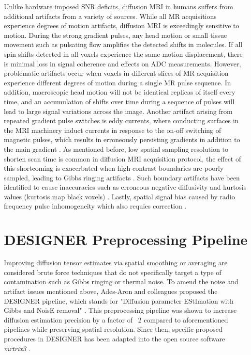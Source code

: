 Unlike hardware imposed SNR deficits, diffusion MRI in humans suffers from additional artifacts from a variety of sources. While all MR acquisitions experience degrees of motion artifacts, diffusion MRI is exceedingly sensitive to motion. During  the strong gradient pulses, any head motion or small tissue movement such as pulsating flow amplifies the detected shifts in molecules. If all spin shifts detected in all voxels experience the same motion displacement, there is minimal loss in signal coherence and effects on ADC measurements. However, problematic artifacts occur when voxels in different slices of MR acquisition experience different degrees of motion during a single MR pulse sequence. In addition, macroscopic head motion will not be identical replicas of itself every time, and an accumulation of shifts over time during a sequence of pulses will lead to large signal variations across the image\cite{le_bihan_artifacts_2006}. Another artifact arising from repeated gradient pulse switches is eddy currents, where conducting surfaces in the MRI machinery induct currents in response to the on-off switching of magnetic pulses, which results in erroneously persisting gradients in addition to the main gradient \cite{andersson_model-based_2002,andersson_integrated_2016}. As mentioned before, low spatial sampling resolution to shorten scan time is common in diffusion MRI acquisition protocol, the effect of this shortcoming is exacerbated when high-contrast boundaries are poorly sampled, leading to Gibbs ringing artifacts \cite{veraart_gibbs_2016,wheeler_2021,tournier_diffusion_2011}. Such boundary artifacts have been identified to cause inaccuracies such as erroneous negative diffusivity and kurtosis values (kurtosis map black voxels) \cite{veraart_gibbs_2016,kellner_gibbs-ringing_2016,perrone_effect_2015}. Lastly, spatial signal bias caused by radio frequency pulse inhomogeneity which also requies correction \cite{bernstein_imaging_2006,belaroussi_intensity_2006}. 

\section{DESIGNER Preprocessing Pipeline}
Improving diffusion tensor estimates via spatial smoothing \cite{tabesh_estimation_2011} or averaging \cite{cui_panda_2013} are considered brute force techniques that do not specifically target a type of contamination such as Gibbs ringing or thermal noise. To amend the noise and artifact issues mentioned above, Ades-Aron and colleagues proposed the DESIGNER pipeline, which stands for "Diffusion parameter EStImation with Gibbs and NoisE removal" \cite{ades-aron_evaluation_2018}. This preprocessing pipeline was shown to increase diffusion estimation precision by a factor of ~2 compared to aforementioned pipelines while preserving spatial resolution. Since then, specific proposed procedures in DESIGNER has been adapted into the open source software \emph{mrtrix3} \cite{tournier_mrtrix3_2019}. 

